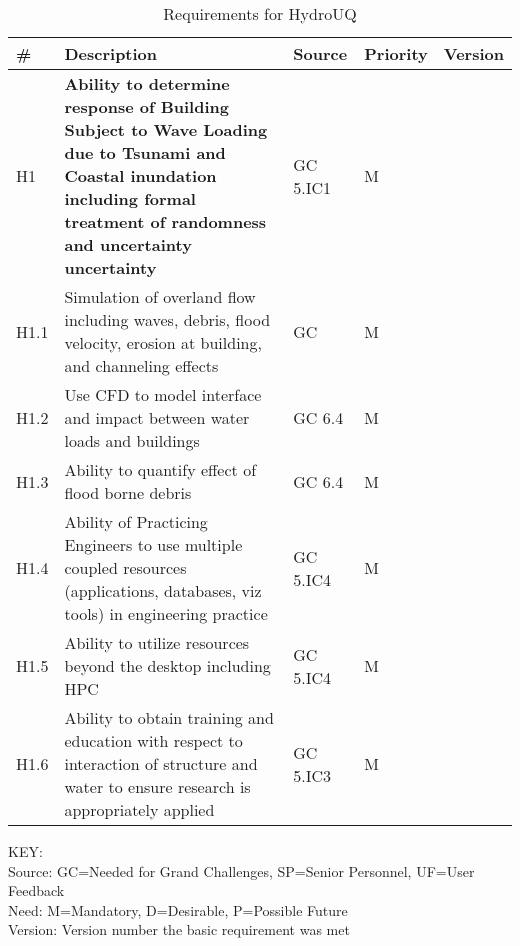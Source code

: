 \begin{longtable}{| p{} | p{} | p{} | p{} |  p{} |}
            
                               \caption{Requirements for HydroUQ} 
\label{tab:featureRequirements}    
 \\
   \hline
\rowcolor{lightgray}
       \# & Description & Source & Priority & Version \\ \hline
       
H1 & \textbf{Ability to determine response of Building Subject to Wave Loading due to Tsunami and Coastal inundation including formal treatment of randomness and uncertainty uncertainty} & GC 5.IC1 & M &  \\ \hline
H1.1 & Simulation of overland flow including waves, debris, flood velocity, erosion at building, and channeling effects & GC & M & \\ \hline
H1.2 & Use CFD to model interface and impact between water loads and buildings & GC 6.4 & M & \\ \hline
H1.3 & Ability to quantify effect of flood borne debris & GC 6.4 & M & \\ \hline
H1.4 & Ability of Practicing Engineers to use multiple coupled resources (applications, databases, viz tools) in engineering practice & GC 5.IC4 & M & \\ \hline
H1.5 & Ability to utilize resources beyond the desktop including HPC & GC 5.IC4 & M & \\ \hline
H1.6 & Ability to obtain training and education with respect to interaction of structure and water to ensure research is appropriately applied  & GC 5.IC3 & M & \\ \hline

\bottomrule 
             
\end{longtable}

\noindent
KEY:\\
Source: GC=Needed for Grand Challenges, SP=Senior Personnel, UF=User Feedback \\
Need: M=Mandatory, D=Desirable, P=Possible Future \\
Version: Version number the basic requirement was met 


